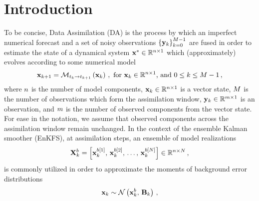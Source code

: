 \section{Introduction}
\label{sec:introduction}

To be concise, Data Assimilation (DA) is the process by which an imperfect numerical forecast and a set of noisy observations $\left \{ {\bf y}_k\right \}_{k=0}^{M-1}$ are fused in order to estimate the state of a dynamical system ${\bf x}^{*} \in \mathbb{R}^{n \times 1}$ which (approximately) evolves according to some numerical model
\begin{eqnarray}
\label{eq:numerical-model}
\displaystyle
{\bf x}_{k+1} = \mathcal{M}_{t_k \rightarrow t_{k+1}} \left ( {\bf x}_k \right )\,, \text{ for ${\bf x}_k \in \mathbb{R}^{n \times 1}$, and $0 \le k \le M-1$} \,,
\end{eqnarray}
%
where $n$ is the number of model components, ${\bf x}_k \in \mathbb{R}^{n \times 1}$ is a vector state, $M$ is the number of observations which form the assimilation window, ${\bf y}_k \in \mathbb{R}^{m \times 1}$ is an observation, and $m$ is the number of observed components from the vector state. For ease in the notation, we assume that observed components across the assimilation window remain unchanged. In the context of the ensemble Kalman smoother (EnKFS), at assimilation steps, an ensemble of model realizations 
\begin{eqnarray}
\label{eq:ensemble-model-realizations}
\displaystyle
{\bf X}^b_k = \left [ {\bf x}^{b[1]}_k,\, {\bf x}^{b[2]}_k,\, \ldots,\, {\bf x}^{b[N]}_k \right ] \in \mathbb{R}^{n \times N} \,,
\end{eqnarray}
is commonly utilized in order to approximate the moments of background error distributions
\begin{eqnarray}
\label{eq:background-error-distribution}
\displaystyle
{\bf x}_k \sim \mathcal{N} \left ( {\bf x}_k^b,\,{\bf B}_k \right ) \,,
\end{eqnarray}
%
